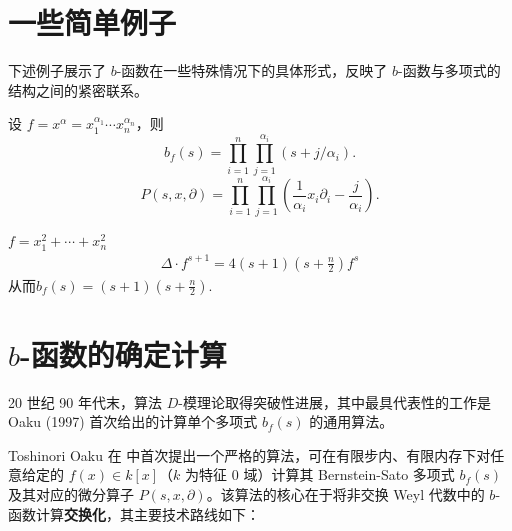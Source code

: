 \documentclass[12pt,a4paper]{ctexrep}   %
\begin{document}
\section{一些简单例子}
下述例子展示了 $b$-函数在一些特殊情况下的具体形式，反映了 $b$-函数与多项式的结构之间的紧密联系。
\begin{example}[单项式]
    设 $f=x^\alpha =x_1^{\alpha_1}\cdots x_n^{\alpha_n}$，则
    \begin{equation*}
        b_f(s) = \prod_{i=1}^n \prod_{j=1}^{\alpha_i} (s + j/\alpha_i).
    \end{equation*}
    \begin{equation*}
        P(s,x,\partial) = \prod_{i=1}^n \prod_{j=1}^{\alpha_i} \left(\frac{1}{\alpha_i} x_i \partial_i - \frac{j}{\alpha_i}\right).
    \end{equation*}
\end{example}

\begin{example}[二次型]
    $f=x_1^2 + \cdots + x_n^2$
    \begin{equation*}
        \begin{aligned}
            \Delta \cdot f^{s+1} = 4(s+1)(s+\frac{n}{2})f^{s}
        \end{aligned}
    \end{equation*}
    从而$b_f(s)=(s+1)(s+\frac{n}{2})$.
\end{example}




\section{$b$-函数的确定计算}

20 世纪 90 年代末，算法 \(D\)-模理论取得突破性进展，其中最具代表性的工作是 Oaku (1997) 首次给出的计算单个多项式 \(b_f(s)\) 的通用算法。

Toshinori Oaku 在 \cite{oaku1997algorithm} 中首次提出一个严格的算法，可在有限步内、有限内存下对任意给定的 \(f(x)\in k[x]\)（\(k\) 为特征 0 域）计算其 Bernstein-Sato 多项式 \(b_f(s)\) 及其对应的微分算子 \(P(s,x,\partial)\)。该算法的核心在于将非交换 Weyl 代数中的 \(b\)-函数计算\textbf{交换化}，其主要技术路线如下：
\end{document}
